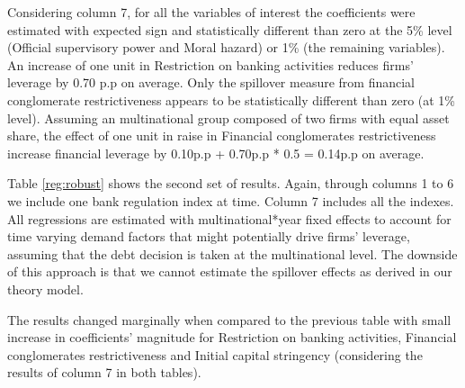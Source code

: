 \documentclass[12pt]{article}
\begin{document}
	 		 Considering column 7, for all the variables of interest the coefficients were estimated with expected sign and statistically different than zero at the 5\% level (Official supervisory power and Moral hazard) or 1\% (the remaining variables). An increase of one unit in Restriction on banking activities reduces firms' leverage by 0.70 p.p on average.  Only the spillover measure from financial conglomerate restrictiveness appears to be statistically different than zero (at 1\% level). Assuming an multinational group composed of two firms with equal asset share, the effect of one unit in raise in Financial conglomerates restrictiveness increase financial leverage by 0.10p.p + 0.70p.p * 0.5 = 0.14p.p on average.
	 		 
	 		 Table \ref{reg:robust} shows the second set of results. Again, through columns 1 to 6 we include one bank regulation index at time. Column 7 includes all the indexes. All regressions are estimated with multinational*year fixed effects to account for time varying demand factors that might potentially drive firms' leverage, assuming that the debt decision is taken at the multinational level. The downside of this approach is that we cannot estimate the spillover effects as derived in our theory model. 
	 		 
	 		The results changed marginally when compared to the previous table with small increase in coefficients' magnitude for Restriction on banking activities, Financial conglomerates restrictiveness and Initial capital stringency (considering the results of column 7 in both tables). 
	  
\end{document}
